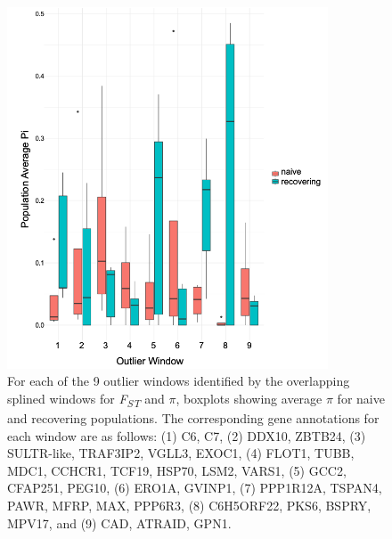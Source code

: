 \documentclass[9pt,twoside,lineno]{pnas-new-SI}
\begin{document}
\begin{figure}

{\centering \includegraphics[width=0.85\textwidth]{figures/boxplot_pi_by_windowpop.png}

}

\caption{\label{fig-boxplot-pi-by-windowpop}For each of the 9 outlier
windows identified by the overlapping splined windows for
\emph{F\textsubscript{ST}} and \(\pi\), boxplots showing average \(\pi\)
for naive and recovering populations. The corresponding gene annotations
for each window are as follows: (1) C6, C7, (2) DDX10, ZBTB24, (3)
SULTR-like, TRAF3IP2, VGLL3, EXOC1, (4) FLOT1, TUBB, MDC1, CCHCR1,
TCF19, HSP70, LSM2, VARS1, (5) GCC2, CFAP251, PEG10, (6) ERO1A, GVINP1,
(7) PPP1R12A, TSPAN4, PAWR, MFRP, MAX, PPP6R3, (8) C6H5ORF22, PKS6,
BSPRY, MPV17, and (9) CAD, ATRAID, GPN1.}

\end{figure}\clearpage

\newpage
\end{document}
